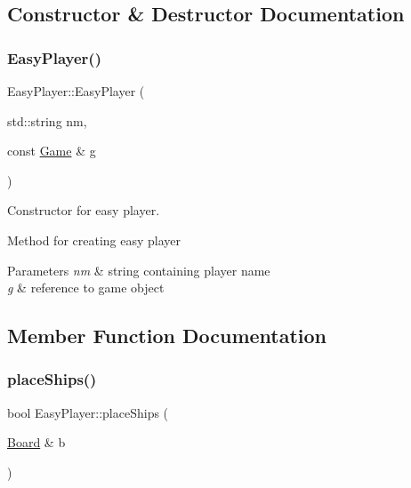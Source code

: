 \subsection{Constructor \& Destructor Documentation}
\mbox{\label{class_easy_player_abf0692676d0bf3c0eb6f6741c621c7ec}} 
\subsubsection{\texorpdfstring{Easy\+Player()}{EasyPlayer()}}
{\footnotesize\ttfamily Easy\+Player\+::\+Easy\+Player (\begin{DoxyParamCaption}\item[{std\+::string}]{nm,  }\item[{const \mbox{\hyperlink{class_game}{Game}} \&}]{g }\end{DoxyParamCaption})}



Constructor for easy player. 

Method for creating easy player 
\begin{DoxyParams}{Parameters}
{\em nm} & string containing player name \\
\hline
{\em g} & reference to game object \\
\hline
\end{DoxyParams}


\subsection{Member Function Documentation}
\mbox{\label{class_easy_player_a4b9d5815113f393615412f7a98176a6c}} 
\subsubsection{\texorpdfstring{place\+Ships()}{placeShips()}}
{\footnotesize\ttfamily bool Easy\+Player\+::place\+Ships (\begin{DoxyParamCaption}\item[{\mbox{\hyperlink{class_board}{Board}} \&}]{b }\end{DoxyParamCaption})\hspace{0.3cm}{\ttfamily [virtual]}}



